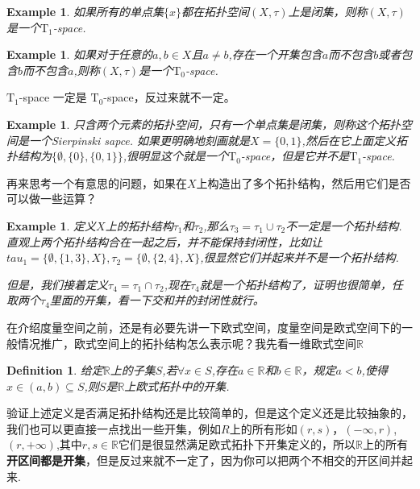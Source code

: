 \documentclass{article}
\newtheorem{example}[theorem]{Example}
\newtheorem{definition}[theorem]{Definition}
\begin{document}
\begin{example}
如果所有的单点集$\{x\}$都在拓扑空间$(X,\tau)$上是闭集，则称$(X,\tau)$是一个$\text{T}_1$-space.
\end{example}

\begin{example}
如果对于任意的$a,b \in X$且$a \neq b$,存在一个开集包含$a$而不包含$b$或者包含$b$而不包含$a$,则称$(X,\tau)$是一个$\text{T}_0$-space.
\end{example}

$\text{T}_1$-space 一定是 $\text{T}_0$-space，反过来就不一定。

\begin{example}
只含两个元素的拓扑空间，只有一个单点集是闭集，则称这个拓扑空间是一个Sierpinski sapce. 如果更明确地刻画就是$X = \{0,1\}$,然后在它上面定义拓扑结构为$\{\emptyset,\{0\},\{0,1\}\}$,很明显这个就是一个$\text{T}_0$-space，但是它并不是$\text{T}_1$-space.
\end{example}

再来思考一个有意思的问题，如果在$X$上构造出了多个拓扑结构，然后用它们是否可以做一些运算？

\begin{example}
定义$X$上的拓扑结构$\tau_1$和$\tau_2$,那么$\tau_3 = \tau_1 \cup \tau_2$不一定是一个拓扑结构. 直观上两个拓扑结构合在一起之后，并不能保持封闭性，比如让$tau_1=\{\emptyset,\{1,3\},X\}, \tau_2 = \{\emptyset,\{2,4\},X\}$,很显然它们并起来并不是一个拓扑结构.

但是，我们接着定义$\tau_4 = \tau_1 \cap \tau_2$,现在$\tau_4$就是一个拓扑结构了，证明也很简单，任取两个$\tau_4$里面的开集，看一下交和并的封闭性就行。
\end{example}


在介绍度量空间之前，还是有必要先讲一下欧式空间，度量空间是欧式空间下的一般情况推广，欧式空间上的拓扑结构怎么表示呢？我先看一维欧式空间$\mathbb{R}$

\begin{definition}
给定$\mathbb{R}$上的子集$S$,若$\forall x \in S$,存在$a \in \mathbb{R}$和$b \in \mathbb{R}$，规定$a < b$,使得$x \in (a,b) \subseteq S$,则$S$是$\mathbb{R}$上欧式拓扑中的开集.
\end{definition}

验证上述定义是否满足拓扑结构还是比较简单的，但是这个定义还是比较抽象的，我们也可以更直接一点找出一些开集，例如$R$上的所有形如$(r,s)$，$(-\infty,r)$,$(r,+\infty)$,其中$r,s \in \mathbb{R}$它们是很显然满足欧式拓扑下开集定义的，所以$\mathbb{R}$上的所有\textbf{开区间都是开集}，但是反过来就不一定了，因为你可以把两个不相交的开区间并起来.
\end{document}
